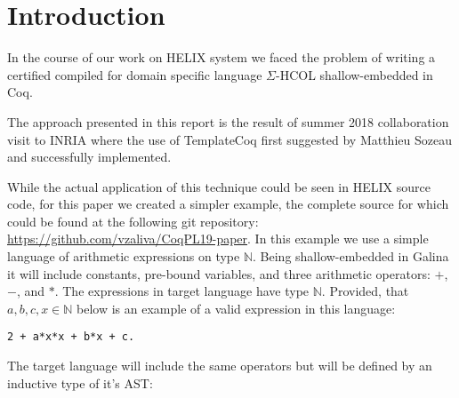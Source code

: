 \documentclass[sigplan]{acmart}\settopmatter{printfolios=true,printccs=false,printacmref=false}
\newcommand{\N}{\mathbb{N}}
\begin{document}


\maketitle

\section{Introduction}

In the course of our work on HELIX system\cite{helixFHPC18} we faced
the problem of writing a certified compiled for domain specific
language $\Sigma$-HCOL shallow-embedded in Coq.

The approach presented in this report is the result of summer 2018
collaboration visit to INRIA where the use of
TemplateCoq\cite{anand2018towards} first suggested by Matthieu Sozeau
and successfully implemented.

While the actual application of this technique could be seen in HELIX
source code, for this paper we created a simpler example, the complete
source for which could be found at the following git repository:
\url{https://github.com/vzaliva/CoqPL19-paper}. In this example we use
a simple language of arithmetic expressions on type $\N$. Being
shallow-embedded in Galina it will include constants, pre-bound
variables, and three arithmetic operators: $+$, $-$, and $*$. The
expressions in target language have type $\N$. Provided, that
$a, b, c, x \in \N$ below is an example of a valid expression in this
language:

\begin{lstlisting}[language=Coq, mathescape=true,
  frame=single, basicstyle=\footnotesize,
  caption=Expression in source language,
  label=lst:sexp]
2 + a*x*x + b*x + c.
\end{lstlisting}

The target language will include the same operators but will be
defined by an inductive type of it's AST:
\end{document}
